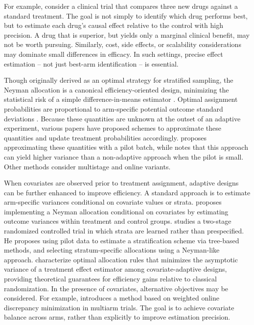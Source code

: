 \documentclass{article}
\begin{document}
For example, consider a clinical trial that compares three new drugs against a standard treatment. The goal is not simply to identify which drug performs best, but to estimate each drug’s causal effect relative to the control with high precision.  A drug that is superior, but yields only a marginal clinical benefit, may not be worth pursuing.  Similarly, cost, side effects, or scalability considerations may dominate small differences in efficacy. In such settings, precise effect estimation -- not just best-arm identification -- is essential.

Though originally derived as an optimal strategy for stratified sampling, the Neyman allocation is a canonical efficiency-oriented design, minimizing the statistical risk of a simple difference-in-means estimator \citep{Neyman1934}. Optimal assignment probabilities are proportional to arm-specific potential outcome standard deviations \citep{Neyman1934, Blackwell1979, Atkinson1982}. Because these quantities are unknown at the outset of an adaptive experiment, various papers have proposed schemes to approximate these quantities and update treatment probabilities accordingly. \cite{blackwell2022batch} proposes approximating these quantities with a pilot batch, while \cite{cai2024performance} notes that this approach can yield higher variance than a non-adaptive approach when the pilot is small. Other methods consider multistage \citep{zhao2023adaptive} and online \citep{dai2023clip, chen2025sigmoid} variants. 

When covariates are observed prior to treatment assignment, adaptive designs can be further enhanced to improve efficiency. A standard approach is to estimate arm-specific variances conditional on covariate values or strata. \cite{hahn2011adaptive} proposes implementing a Neyman allocation conditional on covariates by estimating outcome variances within treatment and control groups. \cite{tabord2018stratification} studies a two-stage randomized controlled trial in which strata are learned rather than prespecified. He proposes using pilot data to estimate a stratification scheme via tree-based methods, and selecting stratum-specific allocations using a Neyman-like approach. \cite{LiOwen2024} characterize optimal allocation rules that minimizes the asymptotic variance of a treatment effect estimator among covariate-adaptive designs, providing theoretical guarantees for efficiency gains relative to classical randomization. In the presence of covariates, alternative objectives may be considered. For example, \cite{Arbour2022} introduces a method based on weighted online discrepancy minimization in multiarm trials. The goal is to achieve covariate balance across arms, rather than explicitly to improve estimation precision. 
\end{document}
